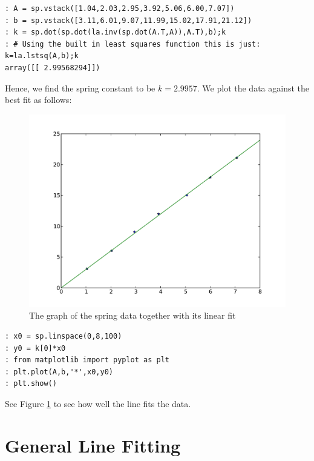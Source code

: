\begin{lstlisting}[style=python]
: A = sp.vstack([1.04,2.03,2.95,3.92,5.06,6.00,7.07])
: b = sp.vstack([3.11,6.01,9.07,11.99,15.02,17.91,21.12])
: k = sp.dot(sp.dot(la.inv(sp.dot(A.T,A)),A.T),b);k
: # Using the built in least squares function this is just: k=la.lstsq(A,b);k
array([[ 2.99568294]])
\end{lstlisting}
Hence, we find the spring constant to be $k = 2.9957$.  We plot the data against the best fit as follows:
\begin{figure}[h!]
\label{fig1}
\begin{center}
\includegraphics[scale = .6]{lab9_line_py}
\caption{The graph of the spring data together with its linear fit}
\label{Fig:SpringFit}
\end{center}
\end{figure}

\begin{lstlisting}[style=python]
: x0 = sp.linspace(0,8,100)
: y0 = k[0]*x0
: from matplotlib import pyplot as plt
: plt.plot(A,b,'*',x0,y0)
: plt.show()
\end{lstlisting}
See Figure \ref{Fig:SpringFit} to see how well the line fits the data.


\section*{General Line Fitting}

